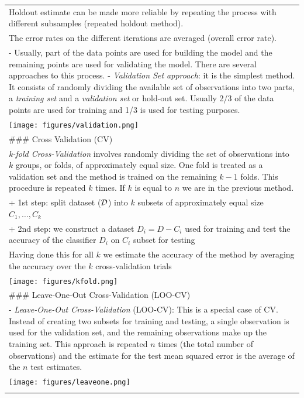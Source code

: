 \documentclass[
]{book}
\begin{document}
\begin{longtable}[]{@{}
  >{\raggedleft\arraybackslash}p{}@{}}
Holdout estimate can be made more reliable by repeating the process with different subsamples (repeated holdout method). \\
The error rates on the different iterations are averaged (overall error rate). \\
- Usually, part of the data points are used for building the model and the remaining points are used for validating the model. There are several approaches to this process.
- \emph{Validation Set approach}: it is the simplest method. It consists of randomly dividing the available set of observations into two parts, a \emph{training set} and a \emph{validation set} or hold-out
set. Usually 2/3 of the data points are used for training and 1/3 is used for testing purposes. \\
\texttt{[image: figures/validation.png]} \\
\#\#\# Cross Validation (CV) \\
\emph{k-fold Cross-Validation} involves randomly dividing the set of observations into \(k\) groups, or folds, of approximately equal size. One fold is treated as a validation set and the method is trained on the remaining \(k-1\) folds. This procedure is repeated \(k\) times. If \(k\) is equal to \(n\) we are in the previous method. \\
+ 1st step: split dataset (\(\cal D\)) into \(k\) subsets of approximately equal size \(C_1, \dots, C_k\) \\
+ 2nd step: we construct a dataset \(D_i = D-C_i\) used for training and test the accuracy of the classifier \(D_i\) on \(C_i\) subset for testing \\
Having done this for all \(k\) we estimate the accuracy of the method by averaging the accuracy over the \(k\) cross-validation trials \\
\texttt{[image: figures/kfold.png]} \\
\#\#\# Leave-One-Out Cross-Validation (LOO-CV) \\
- \emph{Leave-One-Out Cross-Validation} (LOO-CV): This is a special case of CV. Instead of creating two subsets for training and testing, a single observation is used for the validation set, and the remaining observations make up the training set. This approach is repeated \(n\) times (the total number of observations) and the estimate for the test mean squared error is the average of the \(n\) test estimates. \\
\texttt{[image: figures/leaveone.png]} \\
 \\
\bottomrule
\end{longtable}
\end{document}
